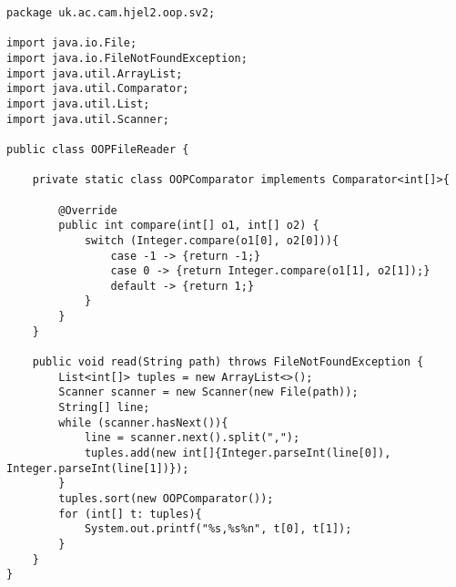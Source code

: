 \documentclass[10pt,\jkfside,a4paper]{article}
\begin{document}
\begin{verbatim}
package uk.ac.cam.hjel2.oop.sv2;

import java.io.File;
import java.io.FileNotFoundException;
import java.util.ArrayList;
import java.util.Comparator;
import java.util.List;
import java.util.Scanner;

public class OOPFileReader {

    private static class OOPComparator implements Comparator<int[]>{

        @Override
        public int compare(int[] o1, int[] o2) {
            switch (Integer.compare(o1[0], o2[0])){
                case -1 -> {return -1;}
                case 0 -> {return Integer.compare(o1[1], o2[1]);}
                default -> {return 1;}
            }
        }
    }

    public void read(String path) throws FileNotFoundException {
        List<int[]> tuples = new ArrayList<>();
        Scanner scanner = new Scanner(new File(path));
        String[] line;
        while (scanner.hasNext()){
            line = scanner.next().split(",");
            tuples.add(new int[]{Integer.parseInt(line[0]), Integer.parseInt(line[1])});
        }
        tuples.sort(new OOPComparator());
        for (int[] t: tuples){
            System.out.printf("%s,%s%n", t[0], t[1]);
        }
    }
}
\end{verbatim}
\end{document}
